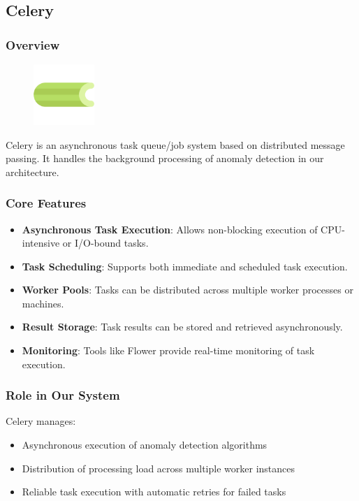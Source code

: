 \subsection{Celery}

\subsubsection{Overview}


\begin{figure}  %
    \vspace{-10pt} %
    \includegraphics[width=2.3cm]{figures/Celery_logo.png}
    \vspace{-10pt}
\end{figure}



Celery is an asynchronous task queue/job system based on distributed message passing. It handles the background processing of anomaly detection in our architecture.

\subsubsection{Core Features}
\begin{itemize}
    \item \textbf{Asynchronous Task Execution}: Allows non-blocking execution of CPU-intensive or I/O-bound tasks.
    \item \textbf{Task Scheduling}: Supports both immediate and scheduled task execution.
    \item \textbf{Worker Pools}: Tasks can be distributed across multiple worker processes or machines.
    \item \textbf{Result Storage}: Task results can be stored and retrieved asynchronously.
    \item \textbf{Monitoring}: Tools like Flower provide real-time monitoring of task execution.
\end{itemize}

\subsubsection{Role in Our System}
Celery manages:
\begin{itemize}
    \item Asynchronous execution of anomaly detection algorithms
    \item Distribution of processing load across multiple worker instances
    \item Reliable task execution with automatic retries for failed tasks
\end{itemize}

